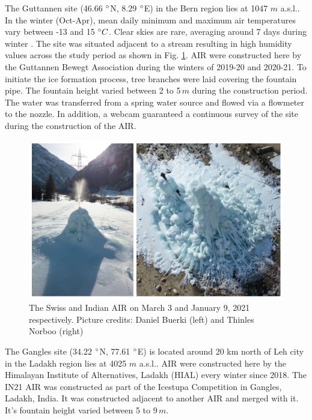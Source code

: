 \documentclass[utf8]{frontiersSCNS} %
\begin{document}
The Guttannen site (46.66 $\degree$N, 8.29 $\degree$E) in the Bern region lies at 1047 $m$ a.s.l.. In the winter (Oct-Apr), mean
daily minimum and maximum air temperatures vary between -13 and 15 $\degree C$. Clear skies are rare, averaging around 7
days during winter \citep{eispalast}. The site was situated adjacent to a stream resulting in high humidity values
across the study period as shown in Fig. \ref{fig:CHsite}. AIR were constructed here by the Guttannen Bewegt Association
during the winters of 2019-20 and 2020-21. To initiate the ice formation process, tree branches were laid covering the
fountain pipe.  The fountain height varied between 2 to 5\,$m$ during the construction period. The water was transferred
from a spring water source and flowed via a flowmeter to the nozzle. In addition, a webcam guaranteed a continuous
survey of the site during the construction of the AIR.

\begin{figure} 
    \begin{center} 
        \includegraphics[width=12 cm]{Figures/2AIR.jpg} 
    \end{center} 
    \caption{The Swiss and Indian AIR on March 3 and January 9, 2021 respectively. Picture credits: Daniel Buerki (left)
    and Thinles Norboo (right)} 
\label{fig:CHsite} 
\end{figure}

The Gangles site (34.22 $\degree$N, 77.61 $\degree$E) is located around 20 km north of Leh city in the Ladakh region
lies at 4025 $m$ a.s.l.. AIR were constructed here by the Himalayan Institute of Alternatives, Ladakh (HIAL) every
winter since 2018. The IN21 AIR was constructed as part of the Icestupa Competition in Gangles, Ladakh, India. It was
constructed adjacent to another AIR and merged with it. It's fountain height varied between 5 to 9\,$m$.
\end{document}
